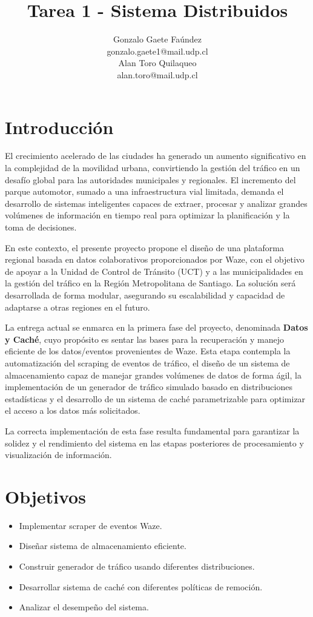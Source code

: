 \documentclass[12pt]{udpreport}
\title{Tarea 1 - Sistema Distribuidos}
\author{
  Gonzalo Gaete Faúndez
  \\
  gonzalo.gaete1@mail.udp.cl
  \\
  Alan Toro Quilaqueo\\
  alan.toro@mail.udp.cl
}
\begin{document}
\maketitle
\tableofcontents
\newpage
\section{Introducción}
El crecimiento acelerado de las ciudades ha generado un aumento significativo en la complejidad de la movilidad urbana, convirtiendo la gestión del tráfico en un desafío global para las autoridades municipales y regionales. El incremento del parque automotor, sumado a una infraestructura vial limitada, demanda el desarrollo de sistemas inteligentes capaces de extraer, procesar y analizar grandes volúmenes de información en tiempo real para optimizar la planificación y la toma de decisiones.

En este contexto, el presente proyecto propone el diseño de una plataforma regional basada en datos colaborativos proporcionados por Waze, con el objetivo de apoyar a la Unidad de Control de Tránsito (UCT) y a las municipalidades en la gestión del tráfico en la Región Metropolitana de Santiago. La solución será desarrollada de forma modular, asegurando su escalabilidad y capacidad de adaptarse a otras regiones en el futuro.

La entrega actual se enmarca en la primera fase del proyecto, denominada \textbf{Datos y Caché}, cuyo propósito es sentar las bases para la recuperación y manejo eficiente de los datos/eventos provenientes de Waze. Esta etapa contempla la automatización del scraping de eventos de tráfico, el diseño de un sistema de almacenamiento capaz de manejar grandes volúmenes de datos de forma ágil, la implementación de un generador de tráfico simulado basado en distribuciones estadísticas y el desarrollo de un sistema de caché parametrizable para optimizar el acceso a los datos más solicitados.

La correcta implementación de esta fase resulta fundamental para garantizar la solidez y el rendimiento del sistema en las etapas posteriores de procesamiento y visualización de información.

\section{Objetivos}
\begin{itemize}
    \item Implementar scraper de eventos Waze.
    \item Diseñar sistema de almacenamiento eficiente.
    \item Construir generador de tráfico usando diferentes distribuciones.
    \item Desarrollar sistema de caché con diferentes políticas de remoción.
    \item Analizar el desempeño del sistema.
\end{itemize}
\end{document}
